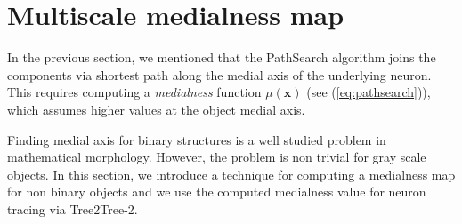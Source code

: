 \section{Multiscale medialness map}

In the previous section, we mentioned that the PathSearch algorithm joins the components via shortest path along the medial axis of the underlying neuron. This requires computing a \textit{medialness} function $\mu(\textbf{x})$ (see (\ref{eq:pathsearch})), which assumes higher values at the object medial axis. 

Finding medial axis for binary structures is a well studied problem in mathematical morphology\cite{bovik2010handbook}. However, the problem is non trivial for gray scale objects. In this section, we introduce a technique for computing a medialness map for non binary objects and we use the computed medialness value for neuron tracing via Tree2Tree-2. 

